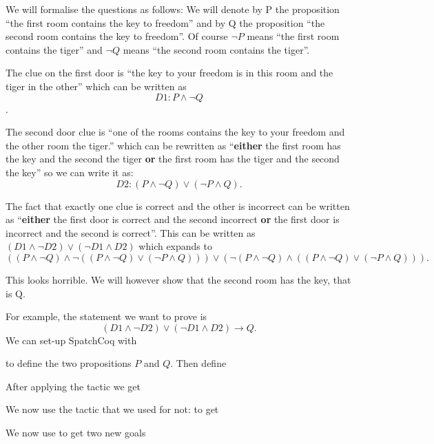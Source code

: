 We will formalise the questions as follows: We will denote by P the proposition  ``the first room contains the key to freedom'' and by Q the proposition ``the second room contains the key to freedom''. Of course $\neg P$ means ``the first room contains the tiger'' and  $\neg Q$ means ``the second room contains the tiger''.

The clue on the first door is ``the key to your freedom  is in this room and the tiger in the other'' which can be written as $$D1:P\land \neg Q$$.

The second door clue is ``one of the rooms contains  the key to your freedom and the other room the tiger.'' which can be rewritten as ``{\bf either} the first room has the key and the second the tiger {\bf or} the first room has the tiger and the second the key'' so we can write it as:
 $$D2 : (P\land \neg Q) \lor (\neg P \land Q).$$ 
 
 The fact that exactly one clue is correct and the other is incorrect can be written as ``{\bf either} the first door is correct and the second incorrect {\bf or} the first door is incorrect and the second is correct''. This can be written as $(D1 \land \neg D2 )\lor (\neg D1 \land D2)$ which expands to $$((P\land \neg Q)\land \neg ((P\land \neg Q) \lor (\neg P \land Q)))\lor (\neg(P\land \neg Q) \land ((P\land \neg Q) \lor (\neg P \land Q))).$$ 

This looks horrible. We will however show that the second room has the key, that is Q.


For example, the statement we want to prove is 
$$(D1 \land \neg D2 )\lor (\neg D1 \land D2)\rightarrow Q.$$ 
We can set-up SpatchCoq with


to define the two propositions $P$ and $Q$.
Then define 



After applying the tactic 
 we get

We now use the tactic that we used for not:
to get


We now use 
to get two new goals

